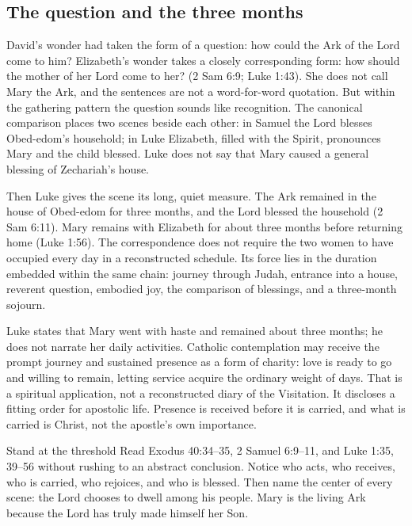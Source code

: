\subsection{The question and the three months}

David's wonder had taken the form of a question: how could the Ark of the Lord
come to him?  Elizabeth's wonder takes a closely corresponding form: how
should the mother of her Lord come to her? (2 Sam 6:9; Luke 1:43).  She does
not call Mary the Ark, and the sentences are not a word-for-word quotation.
But within the gathering pattern the question sounds like recognition.  The
canonical comparison places two scenes beside each other: in Samuel the Lord
blesses Obed-edom's household; in Luke Elizabeth, filled with the Spirit,
pronounces Mary and the child blessed.  Luke does not say that Mary caused a
general blessing of Zechariah's house.

Then Luke gives the scene its long, quiet measure.  The Ark remained in the
house of Obed-edom for three months, and the Lord blessed the household
(2 Sam 6:11).  Mary remains with Elizabeth for about three months before
returning home (Luke 1:56).  The correspondence does not require the two women
to have occupied every day in a reconstructed schedule.  Its force lies in
the duration embedded within the same chain: journey through Judah, entrance
into a house, reverent question, embodied joy, the comparison of blessings,
and a three-month sojourn.

Luke states that Mary went with haste and remained about three months; he does
not narrate her daily activities.  Catholic contemplation may receive the
prompt journey and sustained presence as a form of charity: love is ready to
go and willing to remain, letting service acquire the ordinary weight of days.
That is a spiritual application, not a reconstructed diary of the Visitation.
It discloses a fitting order for apostolic life.  Presence is received before
it is carried, and what is carried is Christ, not the apostle's own importance.

\begin{studybox}{Stand at the threshold}
Read Exodus 40:34--35, 2 Samuel 6:9--11, and Luke 1:35, 39--56 without rushing
to an abstract conclusion.  Notice who acts, who receives, who is carried,
who rejoices, and who is blessed.  Then name the center of every scene: the
Lord chooses to dwell among his people.  Mary is the living Ark because the
Lord has truly made himself her Son.
\end{studybox}
